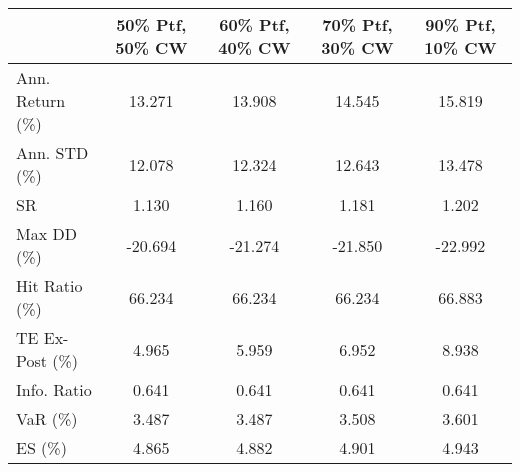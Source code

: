 \begin{tabular}{lcccc}
\toprule
{} &  50\% Ptf, 50\% CW &  60\% Ptf, 40\% CW &  70\% Ptf, 30\% CW &  90\% Ptf, 10\% CW \\
\midrule
Ann. Return (\%) &           13.271 &           13.908 &           14.545 &           15.819 \\
Ann. STD (\%)    &           12.078 &           12.324 &           12.643 &           13.478 \\
SR              &            1.130 &            1.160 &            1.181 &            1.202 \\
Max DD (\%)      &          -20.694 &          -21.274 &          -21.850 &          -22.992 \\
Hit Ratio (\%)   &           66.234 &           66.234 &           66.234 &           66.883 \\
TE Ex-Post (\%)  &            4.965 &            5.959 &            6.952 &            8.938 \\
Info. Ratio     &            0.641 &            0.641 &            0.641 &            0.641 \\
VaR (\%)         &            3.487 &            3.487 &            3.508 &            3.601 \\
ES (\%)          &            4.865 &            4.882 &            4.901 &            4.943 \\
\bottomrule
\end{tabular}
